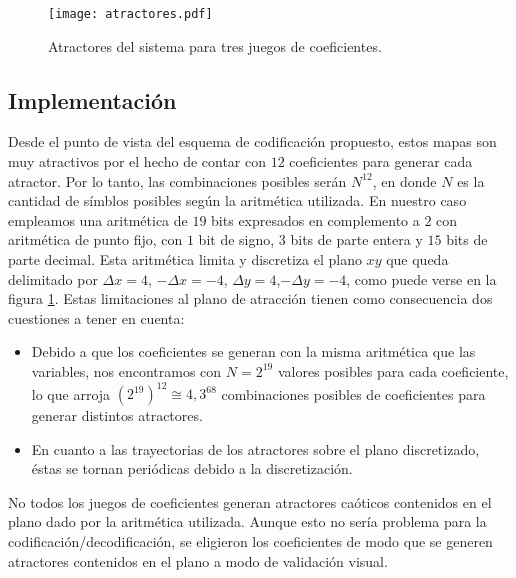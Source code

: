 \begin{figure}
    \centering
    \texttt{[image: atractores.pdf]}\\
    \caption{Atractores del sistema para tres juegos de coeficientes.}\label{fig:atractores}
\end{figure}

\subsection{Implementación}

Desde el punto de vista del esquema de codificación propuesto,
estos mapas son muy atractivos por el hecho de contar con $12$
coeficientes para generar cada atractor. Por lo tanto, las
combinaciones posibles serán $N^{12}$, en donde $N$ es la cantidad
de símblos posibles según la aritmética utilizada. En nuestro caso
empleamos una aritmética de $19$ bits expresados en complemento a
$2$ con aritmética de punto fijo, con $1$ bit de signo, $3$ bits
de parte entera y $15$ bits de parte decimal. Esta aritmética
limita y discretiza el plano $xy$ que queda delimitado por $\Delta
x=4$, $-\Delta x=-4$, $\Delta y=4$,$-\Delta y=-4$, como puede
verse en la figura \ref{fig:atractores}. Estas limitaciones al
plano de atracción tienen como consecuencia dos cuestiones a tener
en cuenta:
\begin{itemize}
    \item
        Debido a que los coeficientes se generan con la misma aritmética que las variables, nos
        encontramos con $N=2^{19}$ valores posibles para cada coeficiente,
        lo que arroja $\left(2^{19}\right)^{12}\cong4,3^{68}$ combinaciones posibles de coeficientes para generar distintos atractores.
    \item
        En cuanto a las trayectorias de los atractores sobre el plano discretizado,
        éstas se tornan periódicas debido a la discretización.
\end{itemize}


No todos los juegos de coeficientes generan atractores caóticos contenidos en el plano dado por la aritmética utilizada. Aunque esto no sería problema para la codificación/decodificación, se eligieron los coeficientes de modo que se generen atractores contenidos en el plano a modo de validación visual.


